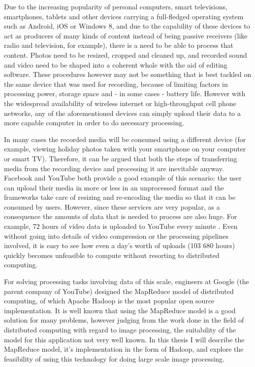 \documentclass [12pt,a4paper]{report}
\begin{document}
Due to the increasing popularity of personal computers, smart televisions, smartphones, tablets and other devices carrying a full-fledged operating system such as Android, iOS or Windows 8, and due to the capability of these devices to act as producers of many kinds of content instead of being passive receivers (like radio and television, for example), there is a need to be able to process that content. Photos need to be resized, cropped and cleaned up, and recorded sound and video need to be shaped into a coherent whole with the aid of editing software. These procedures however may not be something that is best tackled on the same device that was used for recording, because of limiting factors in processing power, storage space and - in some cases - battery life. However with the widespread availability of wireless internet or high-throughput cell phone networks, any of the aforementioned devices can simply upload their data to a more capable computer in order to do necessary processing. 

In many cases the recorded media will be consumed using a different device (for example, viewing holiday photos taken with your smartphone on your computer or smart TV). Therefore, it can be argued that both the steps of transferring media from the recording device and processing it are inevitable anyway. Facebook and YouTube both provide a good example of this scenario: the user can upload their media in more or less in an unprocessed format and the frameworks take care of resizing and re-encoding the media so that it can be consumed by users. However, since these services are very popular, as a consequence the amounts of data that is needed to process are also huge. For example, 72 hours of video data is uploaded to YouTube every minute \cite{youtube_stats}. Even without going into details of video compression or the processing pipelines involved, it is easy to see how even a day's worth of uploads (103 680 hours) quickly becomes unfeasible to compute without resorting to distributed computing.

For solving processing tasks involving data of this scale, engineers at Google (the parent company of YouTube) designed the MapReduce model of distributed computing, of which Apache Hadoop is the most popular open source implementation. It is well known that using the MapReduce model is a good solution for many problems, however judging from the work done in the field of distributed computing with regard to image processing, the suitability of the model for this application not very well known. In this thesis I will describe the MapReduce model, it's implementation in the form of Hadoop, and explore the feasibility of using this technology for doing large scale image processing.
\end{document}
